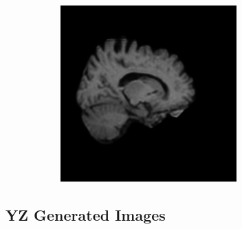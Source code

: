 \documentclass[12pt, fleqn, titlepage]{article}
\newcommand\skipperer{0.45pt}
\begin{document}
\begin{figure}[H]
\begin{subfigure}[b]{0.7\textwidth}
		\hskip\skipperer
		\includegraphics[width=0.15\linewidth]{imgs/3T_no_noise}
	\end{subfigure}
\end{figure}

\subsection{YZ Generated Images}\label{yz_generated}
\end{document}
